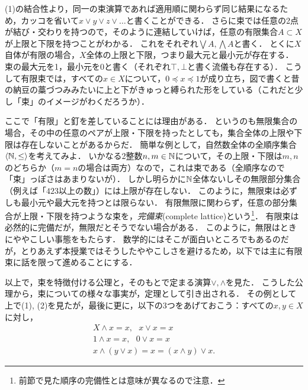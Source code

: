 \documentclass[11pt,a4paper]{jsarticle}
\begin{document}
(1)の結合性より，同一の束演算であれば適用順に関わらず同じ結果になるため，カッコを省いて$x \vee y \vee z \vee \dots$と書くことができる．
さらに束では任意の2点が結び・交わりを持つので，そのように連結していけば，任意の有限集合$A \subset X$が上限と下限を持つことがわかる．
これをそれぞれ$\bigvee A, \bigwedge A$と書く．
とくに$X$自体が有限の場合，$X$全体の上限と下限，つまり最大元と最小元が存在する．
束の最大元を1，最小元を0と書く（それぞれ$\top, \bot$と書く流儀も存在する）．
こうして有限束では，すべての$x \in X$について，$0 \preceq x \preceq 1$が成り立ち，図で書くと昔の納豆の藁づつみみたいに上と下がきゅっと縛られた形をしている（これだと少し「束」のイメージがわくだろうか）．

\begin{attn}
ここで「有限」と釘を差していることには理由がある．
というのも無限集合の場合，その中の任意のペアが上限・下限を持ったとしても，集合全体の上限や下限は存在しないことがあるからだ．
簡単な例として，自然数全体の全順序集合$\langle \mathbb{N}, \leq \rangle$を考えてみよ．
いかなる2整数$n, m \in \mathbb{N}$について，その上限・下限は$m,n$のどちらか（$m=n$の場合は両方）なので，これは束である（全順序なので「束」っぽさはあまりないが）．
しかし明らかに$\mathbb{N}$全体ないしその無限部分集合（例えば「$423$以上の数」）には上限が存在しない．
このように，無限束は必ずしも最小元や最大元を持つとは限らない．
有限無限に関わらず，任意の部分集合が上限・下限を持つような束を，\emph{完備束}(complete lattice)という\footnote{前節で見た順序の完備性とは意味が異なるので注意．}．
有限束は必然的に完備だが，無限だとそうでない場合がある．
このように，無限はときにややこしい事態をもたらす．
数学的にはそこが面白いところでもあるのだが，とりあえず本授業ではそうしたややこしさを避けるため，以下では主に有限束に話を限って進めることにする． 
\end{attn}

以上で，束を特徴付ける公理と，そのもとで定まる演算$\vee, \wedge$を見た．
こうした公理から，束についての様々な事実が，定理として引き出される．
その例として上で(1), (2)を見たが，最後に更に，以下の3つをあげておこう：すべての$x, y \in X$に対し，
\begin{align}
 X \wedge x = x, \ \ \ x \vee x = x \\
 1 \wedge x = x, \ \ \ 0 \vee x = x \\
 x \wedge (y \vee x) = x = (x \wedge y) \vee x .
\end{align}
\end{document}
